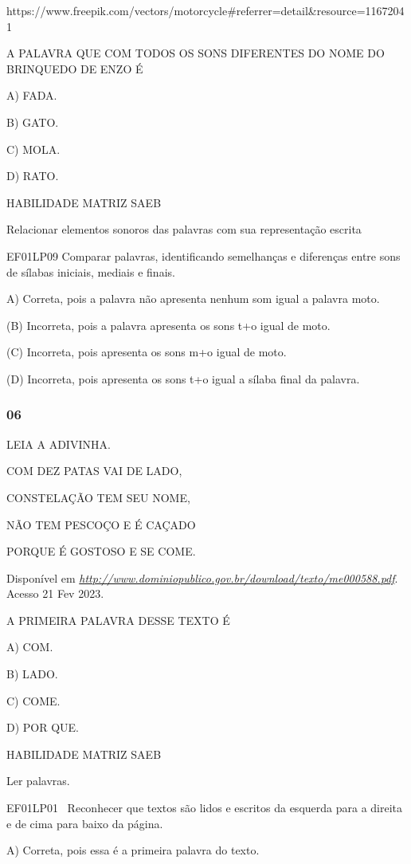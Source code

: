 \begin{escola}
https://www.freepik.com/vectors/motorcycle\#referrer=detail\&resource=11672041

A PALAVRA QUE COM TODOS OS SONS DIFERENTES DO NOME DO BRINQUEDO DE ENZO
É

A) FADA.

B) GATO.

C) MOLA.

D) RATO.

HABILIDADE MATRIZ SAEB

Relacionar elementos sonoros das palavras com sua representação escrita

EF01LP09 Comparar palavras, identificando semelhanças e diferenças entre
sons de sílabas iniciais, mediais e finais.

A) Correta, pois a palavra não apresenta nenhum som igual a palavra
moto.

(B) Incorreta, pois a palavra apresenta os sons t+o igual de moto.

(C) Incorreta, pois apresenta os sons m+o igual de moto.

(D) Incorreta, pois apresenta os sons t+o igual a sílaba final da
palavra.

\subsubsection{06}\label{section-78}

LEIA A ADIVINHA.

COM DEZ PATAS VAI DE LADO,

CONSTELAÇÃO TEM SEU NOME,

NÃO TEM PESCOÇO E É CAÇADO

PORQUE É GOSTOSO E SE COME.

Disponível em
\href{http://www.dominiopublico.gov.br/download/texto/me000588.pdf}{\emph{http://www.dominiopublico.gov.br/download/texto/me000588.pdf}}.
Acesso 21 Fev 2023.

A PRIMEIRA PALAVRA DESSE TEXTO É

A) COM.

B) LADO.

C) COME.

D) POR QUE.

HABILIDADE MATRIZ SAEB

Ler palavras.

EF01LP01 ~Reconhecer que textos são lidos e escritos da esquerda para a
direita e de cima para baixo da página.

A) Correta, pois essa é a primeira palavra do texto.


\end{escola}
